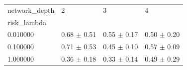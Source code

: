 \begin{tabular}{llll}
\toprule
network_depth & 2 & 3 & 4 \\
risk_lambda &  &  &  \\
\midrule
0.010000 & 0.68 $\pm$ 0.51 & 0.55 $\pm$ 0.17 & 0.50 $\pm$ 0.20 \\
0.100000 & 0.71 $\pm$ 0.53 & 0.45 $\pm$ 0.10 & 0.57 $\pm$ 0.09 \\
1.000000 & 0.36 $\pm$ 0.18 & 0.33 $\pm$ 0.14 & 0.49 $\pm$ 0.29 \\
\bottomrule
\end{tabular}
